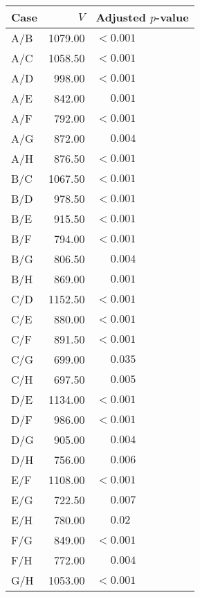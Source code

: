 \begin{tabular}{lrl}
  \toprule
Case & $V$ & Adjusted $p$-value \\ 
  \midrule
A/B & 1079.00 & $< 0.001$\sym{***} \\ 
  A/C & 1058.50 & $< 0.001$\sym{***} \\ 
  A/D & 998.00 & $< 0.001$\sym{***} \\ 
  A/E & 842.00 & $\phantom{< }0.001$\sym{**\phantom{*}} \\ 
  A/F & 792.00 & $< 0.001$\sym{***} \\ 
  A/G & 872.00 & $\phantom{< }0.004$\sym{**\phantom{*}} \\ 
  A/H & 876.50 & $< 0.001$\sym{***} \\ 
  B/C & 1067.50 & $< 0.001$\sym{***} \\ 
  B/D & 978.50 & $< 0.001$\sym{***} \\ 
  B/E & 915.50 & $< 0.001$\sym{***} \\ 
  B/F & 794.00 & $< 0.001$\sym{***} \\ 
  B/G & 806.50 & $\phantom{< }0.004$\sym{**\phantom{*}} \\ 
  B/H & 869.00 & $\phantom{< }0.001$\sym{**\phantom{*}} \\ 
  C/D & 1152.50 & $< 0.001$\sym{***} \\ 
  C/E & 880.00 & $< 0.001$\sym{***} \\ 
  C/F & 891.50 & $< 0.001$\sym{***} \\ 
  C/G & 699.00 & $\phantom{< }0.035$\sym{*\phantom{**}} \\ 
  C/H & 697.50 & $\phantom{< }0.005$\sym{**\phantom{*}} \\ 
  D/E & 1134.00 & $< 0.001$\sym{***} \\ 
  D/F & 986.00 & $< 0.001$\sym{***} \\ 
  D/G & 905.00 & $\phantom{< }0.004$\sym{**\phantom{*}} \\ 
  D/H & 756.00 & $\phantom{< }0.006$\sym{**\phantom{*}} \\ 
  E/F & 1108.00 & $< 0.001$\sym{***} \\ 
  E/G & 722.50 & $\phantom{< }0.007$\sym{**\phantom{*}} \\ 
  E/H & 780.00 & $\phantom{< }0.02$\sym{*\phantom{**}} \\ 
  F/G & 849.00 & $< 0.001$\sym{***} \\ 
  F/H & 772.00 & $\phantom{< }0.004$\sym{**\phantom{*}} \\ 
  G/H & 1053.00 & $< 0.001$\sym{***} \\ 
   \bottomrule
\end{tabular}
